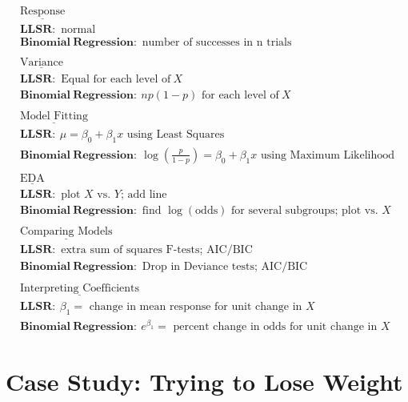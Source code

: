 \documentclass[
]{krantz}
\begin{document}
\begin{gather*}
\underline{\textrm{Response}} \\
\mathbf{LLSR:}\textrm{ normal} \\
\mathbf{Binomial\ Regression:}\textrm{ number of successes in n trials} \\
\textrm{ } \\
\underline{\textrm{Variance}} \\
\mathbf{LLSR:}\textrm{ Equal for each level of}\ X \\
\mathbf{Binomial\ Regression:}\ np(1-p)\textrm{ for each level of}\ X \\
\textrm{ } \\
\underline{\textrm{Model Fitting}} \\
\mathbf{LLSR:}\ \mu=\beta_0+\beta_1x \textrm{ using Least Squares}\\
\mathbf{Binomial\ Regression:}\ \log\left(\frac{p}{1-p}\right)=\beta_0+\beta_1x \textrm{ using Maximum Likelihood}\\
\textrm{ } \\
\underline{\textrm{EDA}} \\
\mathbf{LLSR:}\textrm{ plot $X$ vs. $Y$; add line} \\
\mathbf{Binomial\ Regression:}\textrm{ find $\log(\textrm{odds})$ for several subgroups; plot vs. $X$} \\
\textrm{ } \\
\underline{\textrm{Comparing Models}} \\
\mathbf{LLSR:}\textrm{ extra sum of squares F-tests; AIC/BIC} \\
\mathbf{Binomial\ Regression:}\textrm{ Drop in Deviance tests; AIC/BIC} \\
\textrm{ } \\
\underline{\textrm{Interpreting Coefficients}} \\
\mathbf{LLSR:}\ \beta_1=\textrm{ change in mean response for unit change in $X$} \\
\mathbf{Binomial\ Regression:}\ e^{\beta_1}=\textrm{ percent change in odds for unit change in $X$} 
\end{gather*}

\hypertarget{case-study-trying-to-lose-weight}{%
\section{Case Study: Trying to Lose Weight}\label{case-study-trying-to-lose-weight}}
\end{document}
